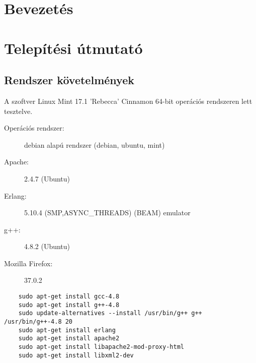 \begin{comment}
	A Felhasználói dokumentáció tartalmazza
	- a megoldott probléma rövid megfogalmazását,
	- a felhasznált módszerek rövid leírását,
	- a program használatához szükséges összes információt

	Magába foglalja a telepítési- (vagy üzemeltetési-) és a végfelhasználói leírást. Ezek
	meghatározott célközönséghez szólnak, könnyen és gyorsan kell, hogy eligazítsák a
	felhasználót a program használatában!

\end{comment}

\section{Bevezetés}
\section{Telepítési útmutató}
\subsection{Rendszer követelmények}
	A szoftver Linux Mint 17.1 'Rebecca' Cinnamon 64-bit operációs rendszeren lett tesztelve. 
	\begin{description}
		\item[Operációs rendszer:] debian alapú rendszer (debian, ubuntu, mint)
		\item[Apache:] 2.4.7 (Ubuntu)
		\item[Erlang:] 5.10.4 (SMP,ASYNC\_THREADS) (BEAM) emulator 
		\item[g++:] 4.8.2 (Ubuntu)
		\item[Mozilla Firefox:] 37.0.2
	\end{description}
	\begin{verbatim}
	sudo apt-get install gcc-4.8
	sudo apt-get install g++-4.8
	sudo update-alternatives --install /usr/bin/g++ g++ /usr/bin/g++-4.8 20
	sudo apt-get install erlang
	sudo apt-get install apache2
	sudo apt-get install libapache2-mod-proxy-html
	sudo apt-get install libxml2-dev
	\end{verbatim}

